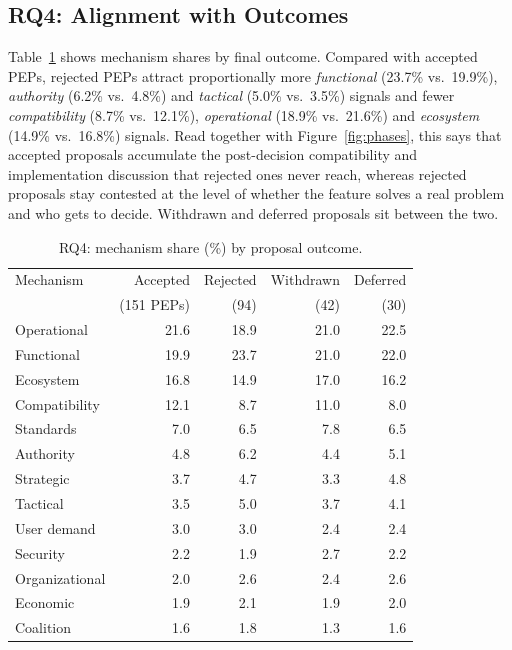 \documentclass[sigconf,screen]{acmart}
\begin{document}
\subsection{RQ4: Alignment with Outcomes}

Table~\ref{tab:rq4} shows mechanism shares by final outcome. Compared with accepted PEPs, rejected PEPs attract proportionally more \emph{functional} (23.7\% vs.\ 19.9\%), \emph{authority} (6.2\% vs.\ 4.8\%) and \emph{tactical} (5.0\% vs.\ 3.5\%) signals and fewer \emph{compatibility} (8.7\% vs.\ 12.1\%), \emph{operational} (18.9\% vs.\ 21.6\%) and \emph{ecosystem} (14.9\% vs.\ 16.8\%) signals. Read together with Figure~\ref{fig:phases}, this says that accepted proposals accumulate the post-decision compatibility and implementation discussion that rejected ones never reach, whereas rejected proposals stay contested at the level of whether the feature solves a real problem and who gets to decide. Withdrawn and deferred proposals sit between the two.

\begin{table}[t]
\caption{RQ4: mechanism share (\%) by proposal outcome.}
\label{tab:rq4}
\begin{tabular}{lrrrr}
\toprule
Mechanism & Accepted & Rejected & Withdrawn & Deferred \\
 & (151 PEPs) & (94) & (42) & (30) \\
\midrule
Operational & 21.6 & 18.9 & 21.0 & 22.5 \\
Functional & 19.9 & 23.7 & 21.0 & 22.0 \\
Ecosystem & 16.8 & 14.9 & 17.0 & 16.2 \\
Compatibility & 12.1 & 8.7 & 11.0 & 8.0 \\
Standards & 7.0 & 6.5 & 7.8 & 6.5 \\
Authority & 4.8 & 6.2 & 4.4 & 5.1 \\
Strategic & 3.7 & 4.7 & 3.3 & 4.8 \\
Tactical & 3.5 & 5.0 & 3.7 & 4.1 \\
User demand & 3.0 & 3.0 & 2.4 & 2.4 \\
Security & 2.2 & 1.9 & 2.7 & 2.2 \\
Organizational & 2.0 & 2.6 & 2.4 & 2.6 \\
Economic & 1.9 & 2.1 & 1.9 & 2.0 \\
Coalition & 1.6 & 1.8 & 1.3 & 1.6 \\
\bottomrule
\end{tabular}
\end{table}
\end{document}
